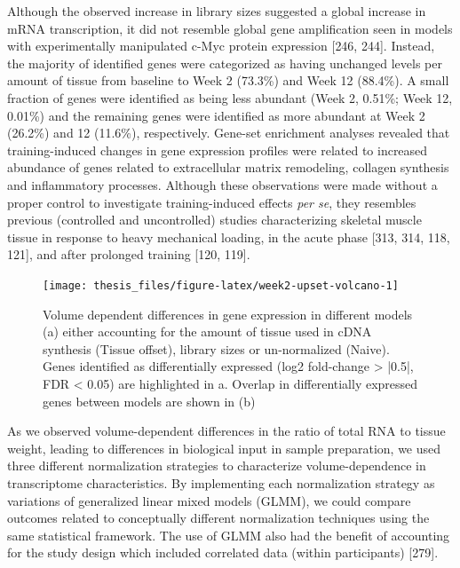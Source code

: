 \documentclass[twoside,10pt]{gihclass} %
\begin{document}
Although the observed increase in library sizes suggested a global increase in mRNA transcription, it did not resemble global gene amplification seen in models with experimentally manipulated c-Myc protein expression
{[}246, 244{]}.
Instead, the majority of identified genes were categorized as having unchanged levels per amount of tissue from baseline to Week 2 (73.3\%) and Week 12 (88.4\%). A small fraction of genes were identified as being less abundant (Week 2, 0.51\%; Week 12, 0.01\%) and the remaining genes were identified as more abundant at Week 2 (26.2\%) and 12 (11.6\%), respectively.
Gene-set enrichment analyses revealed that training-induced changes in gene expression profiles were related to increased abundance of genes related to extracellular matrix remodeling, collagen synthesis and inflammatory processes. Although these observations were made without a proper control to investigate training-induced effects \emph{per se}, they resembles previous (controlled and uncontrolled) studies characterizing skeletal muscle tissue in response to heavy mechanical loading, in the acute phase
{[}313, 314, 118, 121{]},
and after prolonged training {[}120, 119{]}.
\begin{figure}

{\centering \texttt{[image: thesis\_files/figure-latex/week2-upset-volcano-1]} 

}

\caption[General patterns of differentially expressed genes at Week 2]{Volume dependent differences in gene expression in different models (a) either accounting for the amount of tissue used in cDNA synthesis (Tissue offset), library sizes or un-normalized (Naive). Genes identified as differentially expressed (log2 fold-change > |0.5|, FDR < 0.05) are highlighted in a.  Overlap in differentially expressed genes between models are shown in (b)}\label{fig:week2-upset-volcano}
\end{figure}
As we observed volume-dependent differences in the ratio of total RNA to tissue weight, leading to differences in biological input in sample preparation, we used three different normalization strategies to characterize volume-dependence in transcriptome characteristics.
By implementing each normalization strategy as variations of generalized linear mixed models (GLMM), we could compare outcomes related to conceptually different normalization techniques using the same statistical framework.
The use of GLMM also had the benefit of accounting for the study design which included correlated data (within participants)
{[}279{]}.
\end{document}
